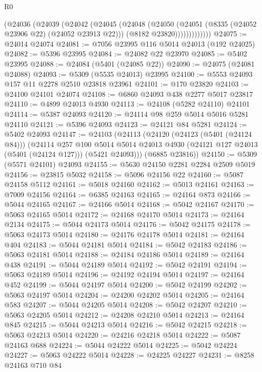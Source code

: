 \begin{lexlean}{R0}
\begin{coremodule}
                (@24036
                  (@24039
                    (@24042
                      (@24045
                        (@24048
                          (@24050
                            (@24051 (@8335 (@24052 @23906 @22) (@24052 @23913 @22)))
                            (@8182 @23820)))))))))))))
@24075 := @24014 @24074
@24081 := @7056 @23995 @116 @5014 @24013 (@192 @24025)
@24082 := @5396 @23995
@24084 := @24082 @22 @23970
@24085 := @5402 @23995
@24088 := @24084 (@5401 (@24085 @22))
@24090 := @24075 (@24081 @24088)
@24093 := @5309 (@5535 @24013) @23995
@24100 := @5553 @24093 @157 @11 @2278 @2510 @23818 @23961
@24101 := @170 @23820
@24103 := @24100 @24101 @24074
@24108 := @6860 @24093 @438 @2277 @5017 @23817
@24110 := @4899 @24013 @4930
@24113 := @24108 (@5282 @24110) @24101
@24114 := @5387 @24093
@24120 := @24114 @98 @259 @5014 @5016 @5281 @24110
@24121 := @5396 @24093
@24123 := @24121 @84 @5281
@24124 := @5402 @24093
@24147 := @24103
    (@24113
      (@24120
        (@24123 (@5401 (@24124 @84)))
        (@24114
          @257
          @100
          @5014
          @5014
          @24013
          @4930
          (@24121 @127 @24013 (@5401 (@24124 @127)))
          (@5421 @24093)))
      (@6885 @23816))
@24150 := @5309 (@5571 @24101) @24093
@24155 := @5630 @24150 @2281 @2284 @2509 @5019
@24156 := @23815 @5032
@24158 := @5096 @24156 @22
@24160 := @5087 @24158 @5112
@24161 := @5018 @24160
@24162 := @5013 @24161
@24163 := @7009 @24156
@24164 := @6385 @24163
@24165 := @24164 @873
@24166 := @5044 @24165
@24167 := @24166 @5014
@24168 := @5042 @24167
@24170 := @5063 @24165 @5014
@24172 := @24168 @24170 @5014
@24173 := @24164 @2134
@24175 := @5044 @24173 @5014
@24176 := @5042 @24175
@24178 := @5063 @24173 @5014
@24180 := @24176 @24178 @5014
@24181 := @24164 @404
@24183 := @5044 @24181 @5014
@24184 := @5042 @24183
@24186 := @5063 @24181 @5014
@24188 := @24184 @24186 @5014
@24189 := @24164 @438
@24191 := @5044 @24189 @5014
@24192 := @5042 @24191
@24194 := @5063 @24189 @5014
@24196 := @24192 @24194 @5014
@24197 := @24164 @452
@24199 := @5044 @24197 @5014
@24200 := @5042 @24199
@24202 := @5063 @24197 @5014
@24204 := @24200 @24202 @5014
@24205 := @24164 @583
@24207 := @5044 @24205 @5014
@24208 := @5042 @24207
@24210 := @5063 @24205 @5014
@24212 := @24208 @24210 @5014
@24213 := @24164 @845
@24215 := @5044 @24213 @5014
@24216 := @5042 @24215
@24218 := @5063 @24213 @5014
@24220 := @24216 @24218 @5014
@24222 := @5087 @24163 @688
@24224 := @5044 @24222 @5014
@24225 := @5042 @24224
@24227 := @5063 @24222 @5014
@24228 := @24225 @24227
@24231 := @8258 @24163 @710 @84

\end{coremodule}
\end{lexlean}

